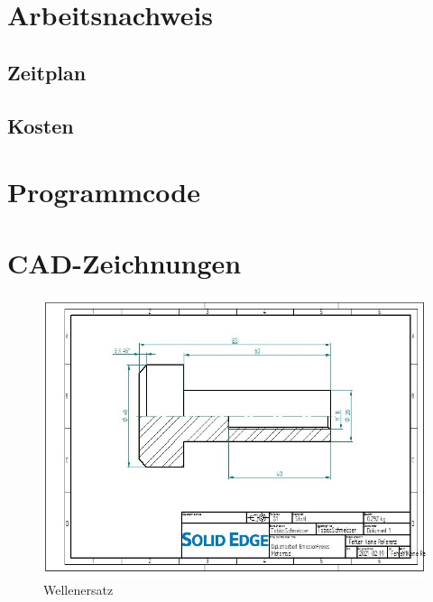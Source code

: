 \appendix
\chapter{Arbeitsnachweis}

\section{Zeitplan}

\section{Kosten}

\chapter{Programmcode}

\chapter{CAD-Zeichnungen}

\begin{figure} [H]
	\begin{center}
		\includegraphics[angle=90, scale=0.9] {figures/mechanik/Welle_Rechts_Zeichnung.jpg}
		\caption{Wellenersatz}
		\label{fig:Wellenersatz1}
	\end{center}
\end{figure}


